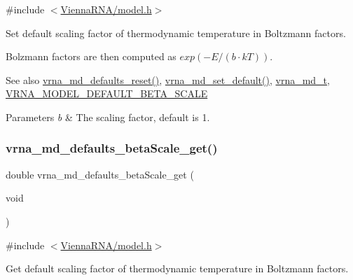 {\ttfamily \#include $<$\mbox{\hyperlink{model_8h}{Vienna\+R\+N\+A/model.\+h}}$>$}



Set default scaling factor of thermodynamic temperature in Boltzmann factors. 

Bolzmann factors are then computed as $ exp(-E / (b \cdot kT))$. \begin{DoxySeeAlso}{See also}
\mbox{\hyperlink{group__model__details_ga70834424cf804d149937de89f80ceb45}{vrna\+\_\+md\+\_\+defaults\+\_\+reset()}}, \mbox{\hyperlink{group__model__details_ga8ac6ff84936282436f822644bf841f66}{vrna\+\_\+md\+\_\+set\+\_\+default()}}, \mbox{\hyperlink{group__model__details_ga1f8a10e12a0a1915f2a4eff0b28ea17c}{vrna\+\_\+md\+\_\+t}}, \mbox{\hyperlink{group__model__details_ga383d3ac8d08c3b6221754b50871c1200}{V\+R\+N\+A\+\_\+\+M\+O\+D\+E\+L\+\_\+\+D\+E\+F\+A\+U\+L\+T\+\_\+\+B\+E\+T\+A\+\_\+\+S\+C\+A\+LE}} 
\end{DoxySeeAlso}

\begin{DoxyParams}{Parameters}
{\em b} & The scaling factor, default is 1. \\
\hline
\end{DoxyParams}
\mbox{\label{group__model__details_gabb8780f5410c52f970d75b044059bd09}} 
\subsubsection{\texorpdfstring{vrna\_md\_defaults\_betaScale\_get()}{vrna\_md\_defaults\_betaScale\_get()}}
{\footnotesize\ttfamily double vrna\+\_\+md\+\_\+defaults\+\_\+beta\+Scale\+\_\+get (\begin{DoxyParamCaption}\item[{void}]{ }\end{DoxyParamCaption})}



{\ttfamily \#include $<$\mbox{\hyperlink{model_8h}{Vienna\+R\+N\+A/model.\+h}}$>$}



Get default scaling factor of thermodynamic temperature in Boltzmann factors. 

